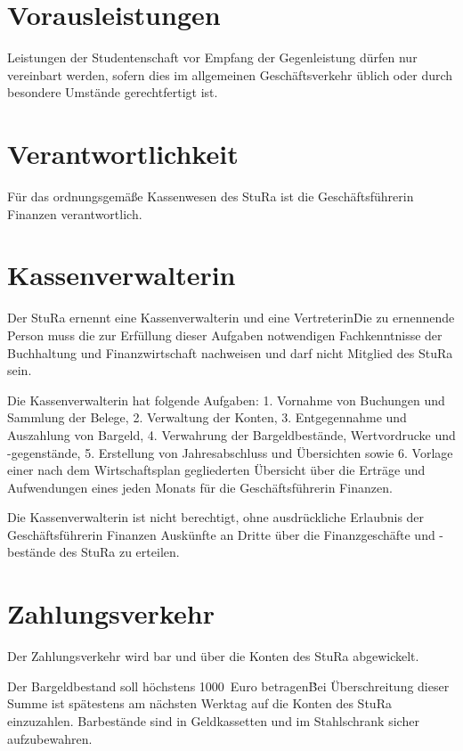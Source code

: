 {\begin{multicols}{2}
\section{Vorausleistungen}

\Abs \Satz Leistungen der Studentenschaft vor Empfang der Gegenleistung dürfen nur vereinbart werden, sofern dies im allgemeinen Geschäftsverkehr üblich oder durch besondere Umstände gerechtfertigt ist.



\section{Verantwortlichkeit}

\Abs \Satz Für das ordnungsgemäße Kassenwesen des StuRa ist die Geschäftsführerin Finanzen verantwortlich.



\section{Kassenverwalterin}

\Abs \Satz Der StuRa ernennt eine Kassenverwalterin und eine Vertreterin\. Die zu ernennende Person muss die zur Erfüllung dieser Aufgaben notwendigen Fachkenntnisse der Buchhaltung und Finanzwirtschaft nachweisen und darf nicht Mitglied des StuRa sein.

\Abs \Satz Die Kassenverwalterin hat folgende Aufgaben:
1. Vornahme von Buchungen und Sammlung der Belege,
2. Verwaltung der Konten,
3. Entgegennahme und Auszahlung von Bargeld,
4. Verwahrung der Bargeldbestände, Wertvordrucke und -gegenstände,
5. Erstellung von Jahresabschluss und Übersichten sowie
6. Vorlage einer nach dem Wirtschaftsplan gegliederten Übersicht über die Erträge und Aufwendungen eines jeden Monats für die Geschäftsführerin Finanzen.

\Abs \Satz Die Kassenverwalterin ist nicht berechtigt, ohne ausdrückliche Erlaubnis der Geschäftsführerin Finanzen Auskünfte an Dritte über die Finanzgeschäfte und -bestände des StuRa zu erteilen.



\section{Zahlungsverkehr}

\Abs \Satz Der Zahlungsverkehr wird bar und über die Konten des StuRa abgewickelt.

\Abs \Satz Der Bargeldbestand soll höchstens 1000~Euro betragen\. Bei Überschreitung dieser Summe ist spätestens am nächsten Werktag auf die Konten des StuRa einzuzahlen. Barbestände sind in Geldkassetten und im Stahlschrank sicher aufzubewahren.


\end{multicols}}
